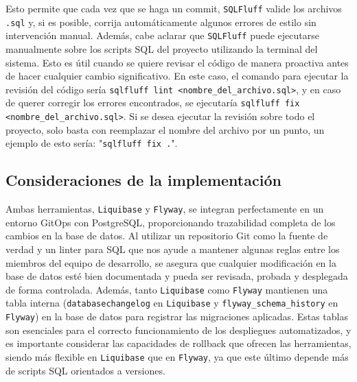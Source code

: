 \documentclass{IEEEtran}
\begin{document}
Esto permite que cada vez que se haga un commit, \texttt{SQLFluff} valide los archivos \texttt{.sql} y, si es posible, corrija automáticamente algunos errores de estilo sin intervención manual. Además, cabe aclarar que \texttt{SQLFluff} puede ejecutarse manualmente sobre los scripts SQL del proyecto utilizando la terminal del sistema. Esto es útil cuando se quiere revisar el código de manera proactiva antes de hacer cualquier cambio significativo. En este caso, el comando para ejecutar la revisión del código sería \texttt{sqlfluff lint <nombre\_del\_archivo.sql>}, y en caso de querer corregir los errores encontrados, se ejecutaría \texttt{sqlfluff fix <nombre\_del\_archivo.sql>}. Si se desea ejecutar la revisión sobre todo el proyecto, solo basta con reemplazar el nombre del archivo por un punto, un ejemplo de esto sería: "\texttt{sqlfluff fix .}".

\subsection{Consideraciones de la implementación}

Ambas herramientas, \texttt{Liquibase} y \texttt{Flyway}, se integran perfectamente en un entorno GitOps con PostgreSQL, proporcionando trazabilidad completa de los cambios en la base de datos. Al utilizar un repositorio Git como la fuente de verdad y un linter para SQL que nos ayude a mantener algunas reglas entre los miembros del equipo de desarrollo, se asegura que cualquier modificación en la base de datos esté bien documentada y pueda ser revisada, probada y desplegada de forma controlada. Además, tanto \texttt{Liquibase} como \texttt{Flyway} mantienen una tabla interna (\texttt{databasechangelog} en \texttt{Liquibase} y \texttt{flyway\_schema\_history} en \texttt{Flyway}) en la base de datos para registrar las migraciones aplicadas. Estas tablas son esenciales para el correcto funcionamiento de los despliegues automatizados, y es importante considerar las capacidades de rollback que ofrecen las herramientas, siendo más flexible en \texttt{Liquibase} que en \texttt{Flyway}, ya que este último depende más de scripts SQL orientados a versiones.
\end{document}
